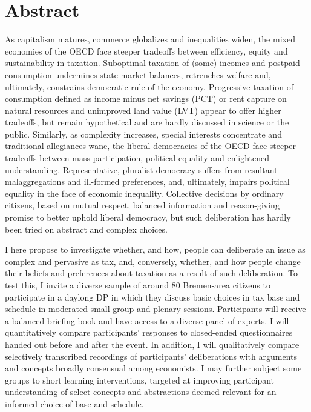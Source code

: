 
\section*{Abstract}

As capitalism matures, commerce globalizes and inequalities widen, the mixed economies of the \gls{OECD} face steeper tradeoffs between efficiency, equity and sustainability in taxation. 
Suboptimal taxation of (some) incomes and postpaid consumption undermines state-market balances, retrenches welfare and, ultimately, constrains democratic rule of the economy.
Progressive taxation of consumption defined as income minus net savings (\gls{PCT}) or rent capture on natural resources and unimproved land value (\gls{LVT}) appear to offer higher tradeoffs, but remain hypothetical and are hardly discussed in science or the public.
Similarly, as complexity increases, special interests concentrate and traditional allegiances wane, the liberal democracies of the \gls{OECD} face steeper tradeoffs between mass participation, political equality and enlightened understanding.
Representative, pluralist democracy suffers from resultant malaggregations and ill-formed preferences, and, ultimately, impairs political equality in the face of economic inequality. %
Collective decisions by ordinary citizens, based on mutual respect, balanced information and reason-giving promise to better uphold liberal democracy, but such deliberation has hardly been tried on abstract and complex choices.

I here propose to investigate whether, and how, people can deliberate an issue as complex and pervasive as tax, and, conversely, whether, and how people change their beliefs and preferences about taxation as a result of such deliberation.
To test this, I invite a diverse sample of around 80 Bremen-area citizens to participate in a daylong \gls{DP} in which they discuss basic choices in tax base and schedule in moderated small-group and plenary sessions.
Participants will receive a balanced briefing book and have access to a diverse panel of experts.
I will quantitatively compare participants' responses to closed-ended questionnaires handed out before and after the event.
In addition, I will qualitatively compare selectively transcribed recordings of participants' deliberations with arguments and concepts broadly consensual among economists. 
I may further subject some groups to short learning interventions, targeted at improving participant understanding of select concepts and abstractions deemed relevant for an informed choice of base and schedule.

